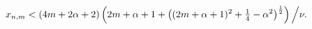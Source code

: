 \[x_{n,m}<(4m+2\alpha+2)\left(2m+\alpha+1+\left((2m+\alpha+1)^{2}+\tfrac{1}{4}-%
\alpha^{2}\right)^{\frac{1}{2}}\right)\Big{/}\nu.\]